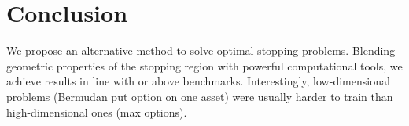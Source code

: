 \section{Conclusion}  


We propose an alternative method to solve %
optimal stopping problems. Blending geometric properties of the stopping region with powerful computational tools, we achieve results in line with or above benchmarks. Interestingly, low-dimensional problems (Bermudan put option on one asset) were usually harder to train than high-dimensional ones (max options). 
